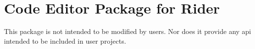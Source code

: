 \chapter{Code Editor Package for Rider}
\hypertarget{md__hey_tea_9_2_library_2_package_cache_2com_8unity_8ide_8rider_0d3_80_824_2_documentation_0i_2_r_e_a_d_m_e}{}\label{md__hey_tea_9_2_library_2_package_cache_2com_8unity_8ide_8rider_0d3_80_824_2_documentation_0i_2_r_e_a_d_m_e}
\label{md__hey_tea_9_2_library_2_package_cache_2com_8unity_8ide_8rider_0d3_80_824_2_documentation_0i_2_r_e_a_d_m_e_autotoc_md959}%
%
 This package is not intended to be modified by users. Nor does it provide any api intended to be included in user projects. 